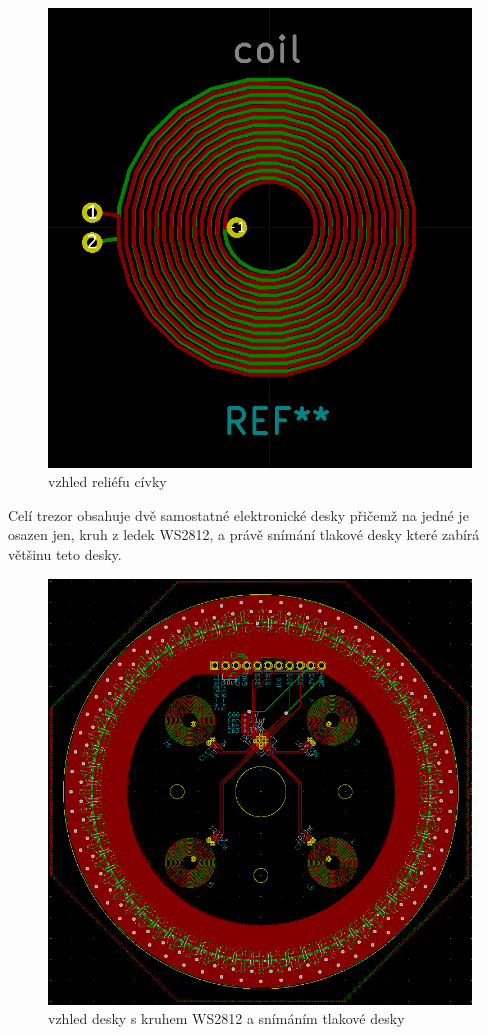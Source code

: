 \begin{figure}[htbp]
    \centering
    \includegraphics[width=\textwidth]{kapitoly/obrazky/E4/elektronika_tlakove_desky/civka.png}
    \caption{vzhled reliéfu cívky}
    \label{fig:M1}
\end{figure}

\newpage

Celí trezor obsahuje dvě samostatné elektronické desky přičemž na jedné je osazen jen, kruh z ledek WS2812, a právě snímání tlakové desky které zabírá 
většinu teto desky.

\begin{figure}[htbp]
    \centering
    \includegraphics[width=\textwidth]{kapitoly/obrazky/E4/elektronika_tlakove_desky/leddeska-KiCad.png}
    \caption{vzhled desky s kruhem WS2812 a snímáním tlakové desky}
    \label{fig:M1}
\end{figure}

\newpage